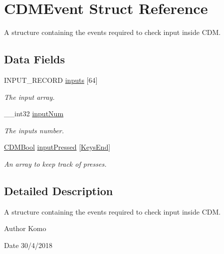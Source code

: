 \hypertarget{struct_c_d_m_event}{}\section{C\+D\+M\+Event Struct Reference}
\label{struct_c_d_m_event}


A structure containing the events required to check input inside C\+DM.  


\subsection*{Data Fields}
\begin{DoxyCompactItemize}
\item 
I\+N\+P\+U\+T\+\_\+\+R\+E\+C\+O\+RD \mbox{\hyperlink{struct_c_d_m_event_aa410219eafdce1e5eddb4770d9e84288}{inputs}} \mbox{[}64\mbox{]}
\begin{DoxyCompactList}\small\item\em The input array. \end{DoxyCompactList}\item 
\+\_\+\+\_\+int32 \mbox{\hyperlink{struct_c_d_m_event_a8710349fb6cd8007331d453943ee67bc}{input\+Num}}
\begin{DoxyCompactList}\small\item\em The inputs number. \end{DoxyCompactList}\item 
\mbox{\hyperlink{_c_d_m_8h_af5296d3141c193195e69417d1825228b}{C\+D\+M\+Bool}} \mbox{\hyperlink{struct_c_d_m_event_a0a068f50666a0d8b50e12592c39e7b25}{input\+Pressed}} \mbox{[}\mbox{\hyperlink{_c_d_m_8h_a8e7d3f25fc77053719b079b29784115fa1a4729fd774e28757eb8b774f4866422}{Keys\+End}}\mbox{]}
\begin{DoxyCompactList}\small\item\em An array to keep track of presses. \end{DoxyCompactList}\end{DoxyCompactItemize}


\subsection{Detailed Description}
A structure containing the events required to check input inside C\+DM. 

\begin{DoxyAuthor}{Author}
Komo 
\end{DoxyAuthor}
\begin{DoxyDate}{Date}
30/4/2018 
\end{DoxyDate}


